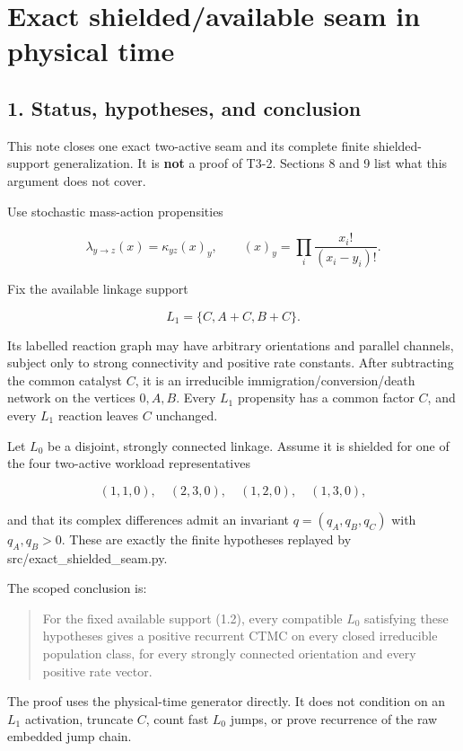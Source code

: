 \section{Exact shielded/available seam in physical
time}

\subsection{1. Status, hypotheses, and
conclusion}

This note closes one exact two-active seam and its complete finite
shielded-support generalization. It is \textbf{not} a proof of T3-2.
Sections 8 and 9 list what this argument does not cover.

Use stochastic mass-action propensities

\[
 \lambda_{y\to z}(x)=\kappa_{yz}(x)_y,\qquad
 (x)_y=\prod_i\frac{x_i!}{(x_i-y_i)!}.
\tag{1.1}
\]

Fix the available linkage support

\[
 L_1=\{C,A+C,B+C\}.
\tag{1.2}
\]

Its labelled reaction graph may have arbitrary orientations and parallel
channels, subject only to strong connectivity and positive rate
constants. After subtracting the common catalyst \(C\), it is an
irreducible immigration/conversion/death network on the vertices
\(0,A,B\). Every \(L_1\) propensity has a common factor \(C\), and every
\(L_1\) reaction leaves \(C\) unchanged.

Let \(L_0\) be a disjoint, strongly connected linkage. Assume it is
shielded for one of the four two-active workload representatives

\[
 (1,1,0),\quad(2,3,0),\quad(1,2,0),\quad(1,3,0),
\tag{1.3}
\]

and that its complex differences admit an invariant \(q=(q_A,q_B,q_C)\)
with \(q_A,q_B>0\). These are exactly the finite hypotheses replayed by
src/exact\_shielded\_seam.py.

The scoped conclusion is:

\begin{quote}
For the fixed available support (1.2), every compatible \(L_0\)
satisfying these hypotheses gives a positive recurrent CTMC on every
closed irreducible population class, for every strongly connected
orientation and every positive rate vector.
\end{quote}

The proof uses the physical-time generator directly. It does not
condition on an \(L_1\) activation, truncate \(C\), count fast \(L_0\)
jumps, or prove recurrence of the raw embedded jump chain.

